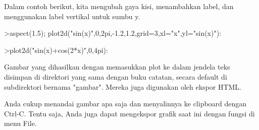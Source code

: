\documentclass{article}
\begin{document}
\begin{eulernotebook}
\begin{eulercomment}
\begin{eulercomment}
\begin{eulercomment}
\begin{eulercomment}
\begin{eulercomment}
\begin{eulercomment}
\begin{eulercomment}
\begin{eulercomment}
\begin{eulercomment}
\begin{eulercomment}
\begin{eulercomment}
Dalam contoh berikut, kita mengubah gaya kisi, menambahkan label, dan
menggunakan label vertikal untuk sumbu y.
\end{eulercomment}
\begin{eulerprompt}
>aspect(1.5); plot2d("sin(x)",0,2pi,-1.2,1.2,grid=3,xl="x",yl="sin(x)"):
\end{eulerprompt}
\begin{eulerprompt}
>plot2d("sin(x)+cos(2*x)",0,4pi):
\end{eulerprompt}
\begin{eulercomment}
Gambar yang dihasilkan dengan memasukkan plot ke dalam jendela teks
disimpan di direktori yang sama dengan buku catatan, secara default di
subdirektori bernama "gambar". Mereka juga digunakan oleh ekspor HTML.

Anda cukup menandai gambar apa saja dan menyalinnya ke clipboard
dengan Ctrl-C. Tentu saja, Anda juga dapat mengekspor grafik saat ini
dengan fungsi di menu File.


\end{eulercomment}
\end{eulercomment}
\end{eulercomment}
\end{eulercomment}
\end{eulercomment}
\end{eulercomment}
\end{eulercomment}
\end{eulercomment}
\end{eulercomment}
\end{eulercomment}
\end{eulercomment}
\end{eulernotebook}
\end{document}

